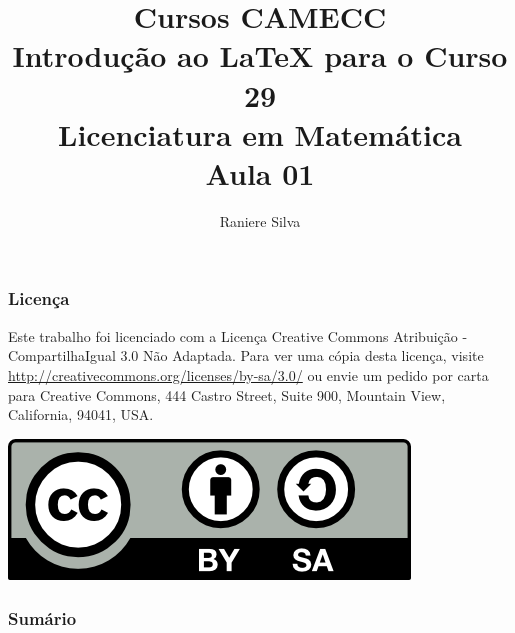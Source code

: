 \documentclass[12pt]{beamer}
\begin{document}
\title[Introdu\c{c}\~{a}o ao LaTeX - 01/04]{Cursos CAMECC \\ Introdu\c{c}\~{a}o ao LaTeX para o Curso 29 \\ Licenciatura em Matem\'{a}tica \\ Aula 01}
\author{Raniere Silva}
\begin{frame}
    \titlepage
\end{frame}

\begin{frame}
    \frametitle{Licen\c{c}a}
    Este trabalho foi licenciado com a Licen\c{c}a Creative Commons Atribui\c{c}\~{a}o - CompartilhaIgual 3.0 N\~{a}o Adaptada. Para ver uma c\'{o}pia desta licen\c{c}a, visite \url{http://creativecommons.org/licenses/by-sa/3.0/} ou envie um pedido por carta para Creative Commons, 444 Castro Street, Suite 900, Mountain View, California, 94041, USA.
    \begin{center}
        \includegraphics[keepaspectratio=true]{../../figures/cc-by-sa.png}
    \end{center}
\end{frame}

\begin{frame}
    \frametitle{Sum\'{a}rio}
    \tableofcontents
\end{frame}
\end{document}
